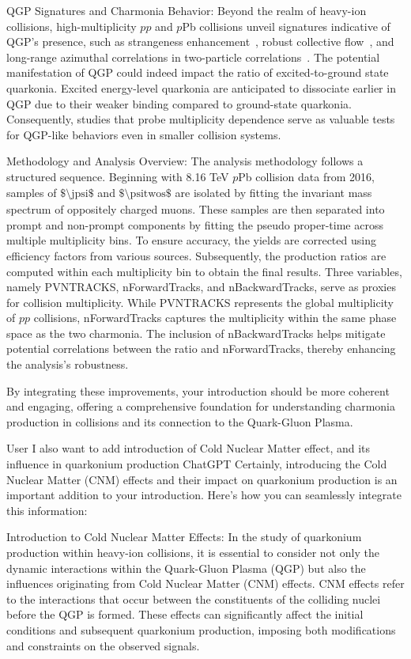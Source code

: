 QGP Signatures and Charmonia Behavior:
Beyond the realm of heavy-ion collisions, high-multiplicity $pp$ and $p$Pb collisions unveil signatures indicative of QGP's presence, such as strangeness enhancement~\cite{ALICE:2016fzo}, robust collective flow~\cite{CMS:2016fnw}, and long-range azimuthal correlations in two-particle correlations~\cite{CMS:2010ifv, ALICE:2012eyl, ATLAS:2012cix, LHCb:2015coe}. The potential manifestation of QGP could indeed impact the ratio of excited-to-ground state quarkonia. Excited energy-level quarkonia are anticipated to dissociate earlier in QGP due to their weaker binding compared to ground-state quarkonia. Consequently, studies that probe multiplicity dependence serve as valuable tests for QGP-like behaviors even in smaller collision systems.

Methodology and Analysis Overview:
The analysis methodology follows a structured sequence. Beginning with 8.16 TeV $p$Pb collision data from 2016, samples of $\jpsi$ and $\psitwos$ are isolated by fitting the invariant mass spectrum of oppositely charged muons. These samples are then separated into prompt and non-prompt components by fitting the pseudo proper-time across multiple multiplicity bins. To ensure accuracy, the yields are corrected using efficiency factors from various sources. Subsequently, the production ratios are computed within each multiplicity bin to obtain the final results. Three variables, namely PVNTRACKS, nForwardTracks, and nBackwardTracks, serve as proxies for collision multiplicity. While PVNTRACKS represents the global multiplicity of $pp$ collisions, nForwardTracks captures the multiplicity within the same phase space as the two charmonia. The inclusion of nBackwardTracks helps mitigate potential correlations between the ratio and nForwardTracks, thereby enhancing the analysis's robustness.

By integrating these improvements, your introduction should be more coherent and engaging, offering a comprehensive foundation for understanding charmonia production in collisions and its connection to the Quark-Gluon Plasma.




User
I also want to add introduction of Cold Nuclear Matter effect, and its influence in quarkonium production
ChatGPT
Certainly, introducing the Cold Nuclear Matter (CNM) effects and their impact on quarkonium production is an important addition to your introduction. Here's how you can seamlessly integrate this information:

Introduction to Cold Nuclear Matter Effects:
In the study of quarkonium production within heavy-ion collisions, it is essential to consider not only the dynamic interactions within the Quark-Gluon Plasma (QGP) but also the influences originating from Cold Nuclear Matter (CNM) effects. CNM effects refer to the interactions that occur between the constituents of the colliding nuclei before the QGP is formed. These effects can significantly affect the initial conditions and subsequent quarkonium production, imposing both modifications and constraints on the observed signals.

